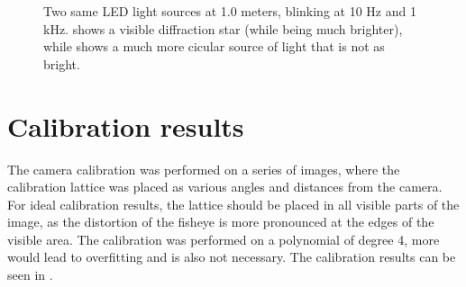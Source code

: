 \begin{figure}[H]
	\centering
	\caption{
  Two same LED light sources at 1.0 meters, blinking at 10 Hz and 1 kHz.
   shows a visible diffraction star (while being much brighter), while  shows a
  much more cicular source of light that is not as bright.
  }
	\label{fig:stars}
\end{figure}


\newpage
\section{Calibration results}

The camera calibration was performed on a series of images, where the calibration lattice was placed as various angles and distances from the camera.
For ideal calibration results, the lattice should be placed in all visible parts of the image, as the distortion of the fisheye is more pronounced at the edges
of the visible area. The calibration was performed on a polynomial of degree 4, more would lead to overfitting and is also not necessary.
The calibration results can be seen in .

